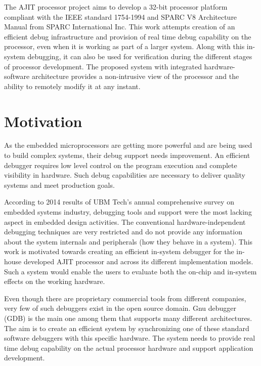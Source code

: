 

The AJIT processor project aims to develop a 32-bit processor platform compliant with the IEEE standard 1754-1994\cite{sparcIEEEstd} and SPARC V8 Architecture Manual\cite{sparcV8} from SPARC International Inc. This work attempts creation of an efficient debug infrastructure and provision of real time debug capability on the processor, even when it is working as part of a larger system. Along with this in-system debugging, it can also be used for verification during the different stages of processor development. The proposed system with integrated hardware-software architecture provides a non-intrusive view of the processor and the ability to remotely modify it at any instant.


\section{Motivation}
As the embedded microprocessors are getting more powerful and are being used to build complex systems, their debug support needs improvement. An efficient debugger requires low level control on the program execution and complete visibility in hardware. Such debug capabilities are necessary to deliver quality systems and meet production goals.

According to 2014 results of UBM Tech's annual comprehensive survey \cite{UBMsurvey} on embedded systems industry, debugging tools and support were the most lacking aspect in embedded design activities. The conventional hardware-independent debugging techniques are very restricted and do not provide any information about the system internals and peripherals (how they behave in a system). This work is motivated towards creating an efficient in-system debugger for the in-house developed AJIT processor and across its different implementation models. Such a system would enable the users to evaluate both the on-chip and in-system effects on the working hardware.

Even though there are proprietary commercial tools from different companies, very few of such debuggers exist in the open source domain. Gnu debugger (GDB) is the main one among them that supports many different architectures. The aim is to create an efficient system by synchronizing one of these standard software debuggers with this specific hardware. The system needs to provide real time debug capability on the actual processor hardware and support application development.

